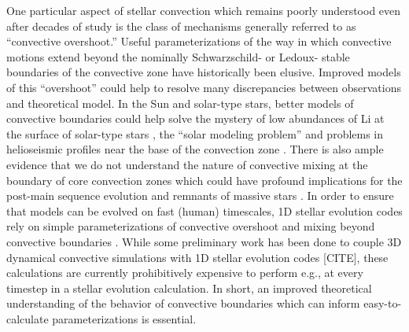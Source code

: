 \documentclass{aastex631}
\begin{document}
One particular aspect of stellar convection which remains poorly understood even after decades of study is the class of mechanisms generally referred to as ``convective overshoot.''
Useful parameterizations of the way in which convective motions extend beyond the nominally Schwarzschild- or Ledoux- stable boundaries of the convective zone have historically been elusive.
Improved models of this ``overshoot'' could help to resolve many discrepancies between observations and theoretical model.
In the Sun and solar-type stars, better models of convective boundaries could help solve the mystery of low abundances of Li at the surface of solar-type stars \citep{pinsonneault1997, dumont_etal_2021}, the ``solar modeling problem'' \citep{basu_antia_2004, bahcall_etal_2005, zhang_li_2012, vinyoles_etal_2017, asplund_etal_2021} and problems in helioseismic profiles near the base of the convection zone \citep{christensen-dalsgaard_etal_2011}.
There is also ample evidence that we do not understand the nature of convective mixing at the boundary of core convection zones \citep{claret_torres_2018, jermyn_etal_2018, viani_basu_2020, martinet_etal_2021, pedersen_etal_2021} which could have profound implications for the post-main sequence evolution and remnants of massive stars \citet{farmer_etal_2019, higgins_vink_2020}.
In order to ensure that models can be evolved on fast (human) timescales, 1D stellar evolution codes rely on simple parameterizations of convective overshoot and mixing beyond convective boundaries \citep{shaviv_salpeter_1973, maeder1975, herwig2000, paxton_etal_2011, paxton_etal_2013, paxton_etal_2018, paxton_etal_2019}.
While some preliminary work has been done to couple 3D dynamical convective simulations with 1D stellar evolution codes [CITE], these calculations are currently prohibitively expensive to perform e.g., at every timestep in a stellar evolution calculation.
In short, an improved theoretical understanding of the behavior of convective boundaries which can inform easy-to-calculate parameterizations is essential.
\end{document}
